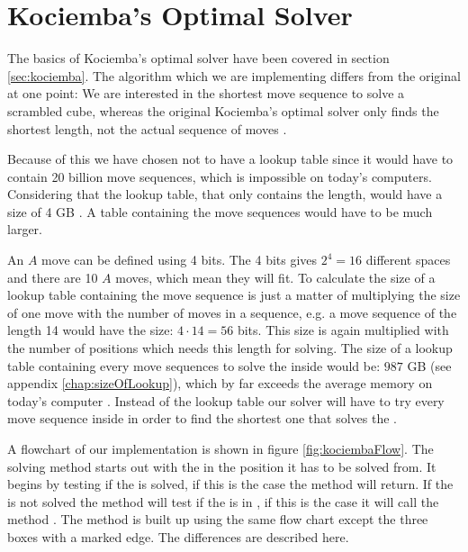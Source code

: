 \chapter{Kociemba's Optimal Solver}
\label{chap:kociembaImplement}
The basics of Kociemba's optimal solver have been covered in section \ref{sec:kociemba}. The algorithm which we are implementing differs from the original at one point:
We are interested in the shortest move sequence to solve a scrambled cube, whereas the original Kociemba's optimal solver only finds the shortest length, not the actual sequence of moves \cite{rokicki09}.

Because of this we have chosen not to have a lookup table since it would have to contain 20 billion move sequences, which is impossible on today's computers. Considering that the lookup table, that only contains the length, would have a size of 4 GB \cite{cubeExplorer}. A table containing the move sequences would have to be much larger.

An $A$ move can be defined using 4 bits.
The 4 bits gives $2^4=16$ different spaces and there are 10 $A$ moves, which mean they will fit.
To calculate the size of a lookup table containing the move sequence is just a matter of multiplying the size of one move with the number of moves in a sequence, e.g. a move sequence of the length 14 would have the size: $4 \cdot 14 = 56$ bits.
This size is again multiplied with the number of positions which needs this length for solving.
The size of a lookup table containing every move sequences to solve the \rubik{} inside  would be: $987$ GB (see appendix \ref{chap:sizeOfLookup}), which by far exceeds the average memory on today's computer \cite{averageRAM} \cite{maxRAM2}.
Instead of the lookup table our solver will have to try every move sequence inside  in order to find the shortest one that solves the \rubik{}.

A flowchart of our implementation is shown in figure \ref{fig:kociembaFlow}.
The solving method starts out with the \rubik{} in the position it has to be solved from.
It begins by testing if the \rubik{} is solved, if this is the case the method will return.
If the \rubik{} is not solved the method will test if the \rubik{} is in , if this is the case it will call the method .
The method  is built up using the same flow chart except the three boxes with a marked edge.
The differences are described here.

